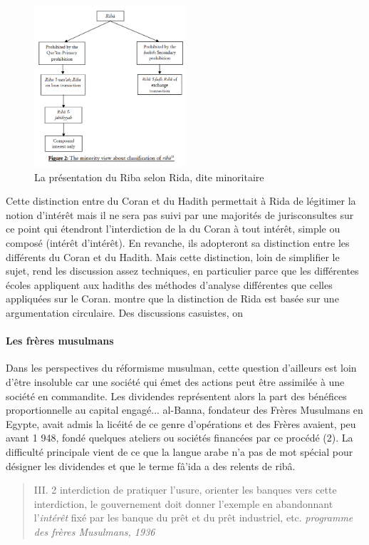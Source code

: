  \begin{figure}[h!]
     \centering
      \includegraphics[width=0.5\textwidth]{CourantsIslamContemporain/ImagesCourantsIslamContemporain/RibaRida.png}
      \caption{La présentation du Riba selon Rida, dite minoritaire}
     \label{fig:MinorityRiba}
 \end{figure}
 Cette distinction entre \riba du Coran et \riba du Hadith permettait à Rida de légitimer la notion d'intérêt mais il ne sera pas suivi par une majorités de jurisconsultes sur ce point qui étendront l'interdiction de la \riba du Coran à tout intérêt, simple ou composé (intérêt d'intérêt). En revanche, ils adopteront sa distinction entre les différents \riba du Coran et du Hadith. Mais cette distinction, loin de simplifier le sujet, rend les discussion assez techniques, en particulier parce que les différentes écoles appliquent aux hadiths des méthodes d'analyse différentes que celles appliquées sur le Coran. \cite{Siddique:DemystifyingRiba} montre que la distinction de Rida est basée sur une argumentation circulaire. Des discussions casuistes, on
 

 
\paragraph{Les frères musulmans}
Dans les perspectives du réformisme musulman,
cette question d'ailleurs est loin d'être insoluble car une société qui émet des
actions peut être assimilée à une société en commandite. Les dividendes
représentent alors la part des bénéfices proportionnelle au capital engagé... 
al-Banna, fondateur des Frères Musulmans en Egypte, avait admis la licéité de ce
genre d'opérations et des Frères avaient, peu avant 1 948, fondé quelques ateliers
ou sociétés financées par ce procédé (2). La difficulté principale vient de ce que la
langue arabe n'a pas de mot spécial pour désigner les dividendes et que le terme
fâ'ida a des relents de ribâ.
\begin{quote}
    III. 2 interdiction de pratiquer l'usure, orienter les banques vers cette interdiction, le gouvernement doit donner l'exemple en abandonnant l'\textit{intérêt} fixé par les banque du prêt et du prêt industriel, etc. \textit{programme des frères Musulmans, 1936}
\end{quote}

